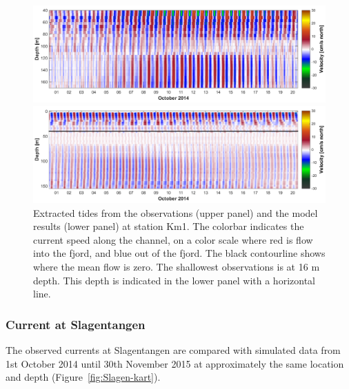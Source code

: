 \begin{figure}[ht]
	\centerline{
		\includegraphics*[trim=0 0 0 0,clip=true,width=\textwidth]{Figurer/Filtvedt_obs_tide}}
	\centerline{
		\includegraphics*[trim=0 0 0 0,clip=true,width=\textwidth]{Figurer/Filtvedt_sim_tide}}
	\caption{\small Extracted tides from the observations (upper panel) and the model results (lower panel) at station Km1.
The colorbar indicates the current speed along the channel, on a color scale where red is flow into the fjord, and blue out of the fjord.
The black contourline shows where the mean flow is zero. The shallowest observations is at 16 m depth. This depth is indicated in the lower panel with a horizontal line. %
}
	\label{fig:Filtvedt-tide}
\end{figure}



\clearpage 
\subsubsection{Current at Slagentangen}
\label{subsubsec:slagen}
The observed currents at Slagentangen are compared with simulated data from 1st October 2014 until 30th November 2015 at approximately the same location and depth (Figure~\ref{fig:Slagen-kart}).


